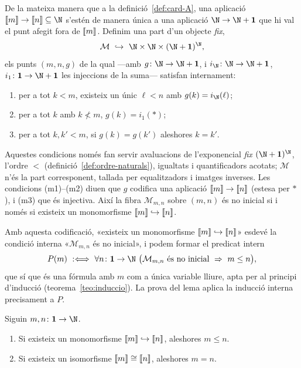 \begin{definicio}\label{def:mono-segments}
De la mateixa manera que a la definició~\ref{def:card-A}, una aplicació
\(\seg{m}\to\seg{n}\subseteq\N\) s'estén de manera única a una aplicació
\(\N\to\N+\mathbf1\) que hi val el punt afegit fora de \(\llbracket m\rrbracket\). Definim
una part d'un objecte \emph{fix},
\[
\mathcal M\ \hookrightarrow\ \N\times\N\times(\N+\mathbf1)^{\N},
\]
els punts \((m,n,g)\) de la qual ---amb \(g\colon\N\to\N+\mathbf1\), i
\(i_\N\colon\N\to\N+\mathbf1\), \(i_1\colon\mathbf1\to\N+\mathbf1\) les
injeccions de la suma--- satisfan internament:
\begin{enumerate}
\item[(m1)] per a tot \(k<m\), existeix un únic \(\ell<n\) amb
\(g(k)=i_\N(\ell)\);
\item[(m2)] per a tot \(k\) amb \(k\not<m\), \(g(k)=i_1(\ast)\);
\item[(m3)] per a tot \(k,k'<m\), si \(g(k)=g(k')\) aleshores \(k=k'\).
\end{enumerate}
Aquestes condicions només fan servir avaluacions de l'exponencial \emph{fix}
\((\N+\mathbf1)^{\N}\), l'ordre \(<\) (definició~\ref{def:ordre-naturals}),
igualtats i quantificadors acotats; \(\mathcal M\) n'és la part
corresponent, tallada per equalitzadors i imatges inverses. Les condicions
(m1)--(m2) diuen que \(g\) codifica una aplicació \(\llbracket m\rrbracket\to\llbracket n\rrbracket\)
(estesa per \(\ast\)), i (m3) que és injectiva. Així la fibra
\(\mathcal M_{m,n}\) sobre \((m,n)\) és no inicial si i només si existeix un
monomorfisme \(\llbracket m\rrbracket\hookrightarrow\llbracket n\rrbracket\).
\end{definicio}

Amb aquesta codificació, «existeix un monomorfisme
\(\llbracket m\rrbracket\hookrightarrow\llbracket n\rrbracket\)» esdevé la condició interna
«\(\mathcal M_{m,n}\) és no inicial», i podem formar el predicat intern
\[
P(m)\ :\Longleftrightarrow\ \forall n\colon\mathbf1\to\N\ \bigl(\mathcal
M_{m,n}\text{ és no inicial}\ \Rightarrow\ m\le n\bigr),
\]
que sí que és una fórmula amb \(m\) com a única variable lliure, apta per al
principi d'inducció (teorema~\ref{teo:induccio}). La prova del lema aplica
la inducció interna precisament a \(P\).

\begin{lema}\label{lema:comparacio-ordinals}
Siguin \(m,n\colon\mathbf1\to\N\).
\begin{enumerate}
\item Si existeix un monomorfisme \(\llbracket m\rrbracket\hookrightarrow\llbracket n\rrbracket\),
aleshores \(m\le n\).
\item Si existeix un isomorfisme \(\llbracket m\rrbracket\cong\llbracket n\rrbracket\), aleshores \(m=n\).
\end{enumerate}
\end{lema}

